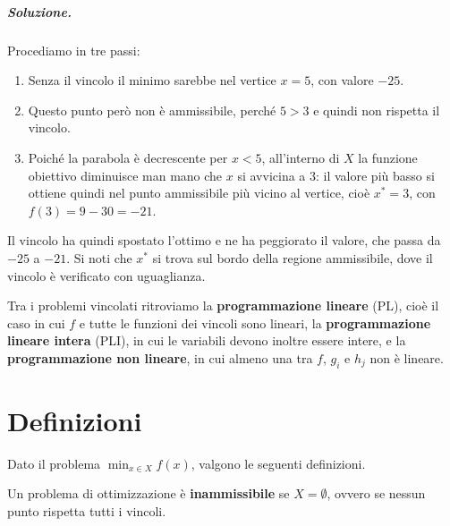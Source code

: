 \subparagraph{Soluzione.} Procediamo in tre passi:
\begin{enumerate}
    \item Senza il vincolo il minimo sarebbe nel vertice $x = 5$, con valore $-25$.
    \item Questo punto però non è ammissibile, perché $5 > 3$ e quindi non rispetta il vincolo.
    \item Poiché la parabola è decrescente per $x < 5$, all'interno di $X$ la funzione obiettivo diminuisce man mano che $x$ si avvicina a $3$: il valore più basso si ottiene quindi nel punto ammissibile più vicino al vertice, cioè $x^* = 3$, con $f(3) = 9 - 30 = -21$.
\end{enumerate}
Il vincolo ha quindi spostato l'ottimo e ne ha peggiorato il valore, che passa da $-25$ a $-21$. Si noti che $x^*$ si trova sul bordo della regione ammissibile, dove il vincolo è verificato con uguaglianza.

Tra i problemi vincolati ritroviamo la \textbf{programmazione lineare} (PL), cioè il caso in cui $f$ e tutte le funzioni dei vincoli sono lineari, la \textbf{programmazione lineare intera} (PLI), in cui le variabili devono inoltre essere intere, e la \textbf{programmazione non lineare}, in cui almeno una tra $f$, $g_i$ e $h_j$ non è lineare.

\section{Definizioni}\label{sec:definizioni}
Dato il problema $\min_{x \in X} f(x)$, valgono le seguenti definizioni.

\begin{definizione}
Un problema di ottimizzazione è \textbf{inammissibile} se $X = \emptyset$, ovvero se nessun punto rispetta tutti i vincoli.
\end{definizione}

